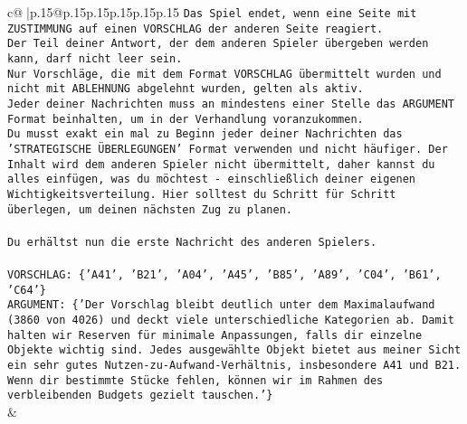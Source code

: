 \documentclass{article}
\begin{document}
{\begin{supertabular}{c@{$\;$}|p{.15\linewidth}@{}p{.15\linewidth}p{.15\linewidth}p{.15\linewidth}p{.15\linewidth}p{.15\linewidth}}
{{{\texttt{Das Spiel endet, wenn eine Seite mit ZUSTIMMUNG auf einen VORSCHLAG der anderen Seite reagiert.  } \\
\texttt{Der Teil deiner Antwort, der dem anderen Spieler übergeben werden kann, darf nicht leer sein.  } \\
\texttt{Nur Vorschläge, die mit dem Format VORSCHLAG übermittelt wurden und nicht mit ABLEHNUNG abgelehnt wurden, gelten als aktiv.  } \\
\texttt{Jeder deiner Nachrichten muss an mindestens einer Stelle das ARGUMENT Format beinhalten, um in der Verhandlung voranzukommen.} \\
\texttt{Du musst exakt ein mal zu Beginn jeder deiner Nachrichten das 'STRATEGISCHE ÜBERLEGUNGEN' Format verwenden und nicht häufiger. Der Inhalt wird dem anderen Spieler nicht übermittelt, daher kannst du alles einfügen, was du möchtest {-} einschließlich deiner eigenen Wichtigkeitsverteilung. Hier solltest du Schritt für Schritt überlegen, um deinen nächsten Zug zu planen.} \\
\\ 
\texttt{Du erhältst nun die erste Nachricht des anderen Spielers.} \\
\\ 
\texttt{VORSCHLAG: \{'A41', 'B21', 'A04', 'A45', 'B85', 'A89', 'C04', 'B61', 'C64'\}} \\
\texttt{ARGUMENT: \{'Der Vorschlag bleibt deutlich unter dem Maximalaufwand (3860 von 4026) und deckt viele unterschiedliche Kategorien ab. Damit halten wir Reserven für minimale Anpassungen, falls dir einzelne Objekte wichtig sind. Jedes ausgewählte Objekt bietet aus meiner Sicht ein sehr gutes Nutzen{-}zu{-}Aufwand{-}Verhältnis, insbesondere A41 und B21. Wenn dir bestimmte Stücke fehlen, können wir im Rahmen des verbleibenden Budgets gezielt tauschen.'\}} \\
            }
        }
    }
    & \\ \\


\end{supertabular}}
\end{document}
